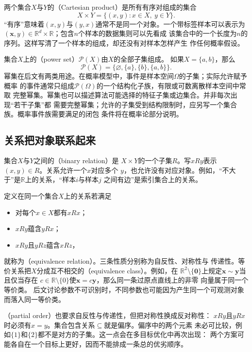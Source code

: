两个集合$X$与$Y$的（Cartesian product）是所有有序对组成的集合
\[
  X\times Y=\{(x,y):x\in X,\ y\in Y\}.
\]
“有序”意味着$(x,y)$与$(y,x)$通常不是同一个对象。一个带标签样本可以表示为
$(\bm{x},y)\in\mathbb{R}^d\times\mathbb{R}$；包含$n$个样本的数据集则可以先看成
该集合中的一个长度为$n$的序列。这样写清了一个样本的组成，却还没有对样本怎样产生
作任何概率假设。

集合$X$上的（power set）$\mathcal{P}(X)$由$X$的全部子集组成。
如果$X=\{a,b\}$，那么
\[
  \mathcal{P}(X)=\{\varnothing,\{a\},\{b\},\{a,b\}\}.
\]
幂集在后文有两类用途。在概率模型中，事件是样本空间$\Omega$的子集；实际允许赋予概率
的事件通常只组成$\mathcal{P}(\Omega)$的一个结构化子族，有限或可数离散样本空间中常取
完整幂集。幂集也可以描述算法可能选择的特征子集或边集合。并非每次出现“若干子集”都
需要完整幂集；允许的子集受到结构限制时，应另写一个集合族。概率事件族需要满足的闭包
条件将在概率论部分说明。

\subsection{关系把对象联系起来}

集合$X$与$Y$之间的（binary relation）是
$X\times Y$的一个子集$R$。写$xRy$表示$(x,y)\in R$。关系允许一个$x$对应多个
$y$，也允许没有对应对象。例如，“不大于”是$\mathbb{R}$上的关系，“样本$i$与样本$j$
之间有边”是索引集合上的关系。

定义在同一个集合$X$上的关系若满足
\begin{itemize}
  \item 对每个$x\in X$都有$xRx$；
  \item $xRy$蕴含$yRx$；
  \item $xRy$且$yRz$蕴含$xRz$，
\end{itemize}
就称为（equivalence relation）。三条性质分别称为自反性、对称性与
传递性。等价关系把$X$分成互不相交的（equivalence class）。例如，在
$\mathbb{R}^2\setminus\{\bm{0}\}$上规定$\bm{x}\sim\bm{y}$当且仅当存在
$c\in\mathbb{R}\setminus\{0\}$使$\bm{x}=c\bm{y}$，那么同一条过原点直线上的非零
向量属于同一个等价类。
后文讨论参数不可识别时，不同参数也可能因为产生同一个可观测对象而落入同一等价类。

（partial order）也要求自反性与传递性，但把对称性换成反对称性：
$xRy$且$yRx$时必须有$x=y$。集合包含关系$\subseteq$就是偏序。偏序中的两个元素
未必可比较，例如$\{1\}$和$\{2\}$都不是对方的子集。这一点会在多目标优化中再次出现：
两个方案可能各自在一个目标上更好，因而不能排成一条总的优劣顺序。

